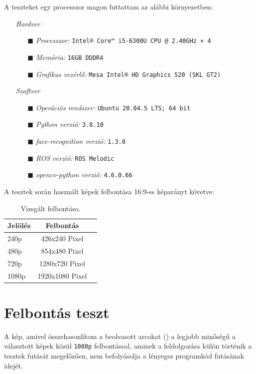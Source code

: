 A teszteket egy processzor magon futtattam az alábbi környezetben:
\begin{itemize}
    \item[] \emph{Hardver}
    \begin{itemize}
        \item[$\blacksquare$] \emph{Processzor:} \verb|Intel® Core™ i5-6300U CPU @ 2.40GHz × 4|
        \item[$\blacksquare$] \emph{Memória:} \verb|16GB DDDR4|
        \item[$\blacksquare$] \emph{Grafikus vezérlő:} \verb|Mesa Intel® HD Graphics 520 (SKL GT2)|
    \end{itemize}
    \item[] \emph{Szoftver}
    \begin{itemize}
        \item[$\blacksquare$] \emph{Operációs rendszer:} \verb|Ubuntu 20.04.5 LTS; 64 bit|
        \item[$\blacksquare$] \emph{Python verzió:} \verb|3.8.10|
        \item[$\blacksquare$] \emph{face-recognition verzió:} \verb|1.3.0|
        \item[$\blacksquare$] \emph{ROS verzió:} \verb|ROS Melodic|
        \item[$\blacksquare$] \emph{opencv-python verzió:} \verb|4.6.0.66|
    \end{itemize}
\end{itemize}

A tesztek során használt képek felbontása 16:9-es képarányt követve:
\begin{table}[!ht]
	\footnotesize
	\centering
	\begin{tabular}{ l c c }
		\toprule
		Jelölés & Felbontás \\
		\midrule
		240p &  426x240 Pixel\\
		480p &  854x480 Pixel\\
        720p &  1280x720 Pixel\\
        1080p &  1920x1080 Pixel\\
		\bottomrule
	\end{tabular}
	\caption{Vizsgált felbontáso.}
	\label{tab:TabularExample}
\end{table}

\clearpage
\section{Felbontás teszt}
A kép, amivel összehasonlítom a beolvasott arcokat () a legjobb minőségű a választott képek közül \verb|1080p| felbontással, aminek a feldolgozása külön történik a tesztek futását megelőzően, nem befolyásolja a lényeges programkód futásának idejét.

